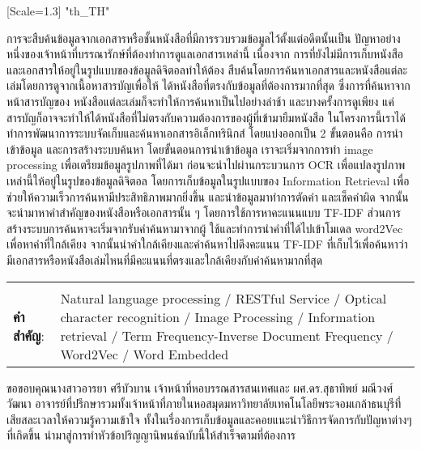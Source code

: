 \documentclass[12pt,oneside,openright,a4paper]{cpe-thai-project}
\begin{document}
{\newfontfamily{}[Scale=1.3]
\XeTeXlinebreaklocale "th_TH"	
\thaifont
\thaiabstract

การจะสืบค้นข้อมูลจากเอกสารหรือชั้นหนังสือที่มีการรวบรวมข้อมูลไว้ตั้งแต่อดีตนั้นเป็น
ปัญหาอย่างหนึ่งของเจ้าหน้าที่บรรณารักษ์ที่ต้องทำการดูแลเอกสารเหล่านี้ เนื่องจาก
การที่ยังไม่มีการเก็บหนังสือและเอกสารให้อยู่ในรูปแบบของข้อมูลดิจิตอลทำให้ต้อง
สืบค้นโดยการค้นหาเอกสารและหนังสือแต่ละเล่มโดยการดูจากเนื้อหาสารบัญเพื่อให้
ได้หนังสือที่ตรงกับข้อมูลที่ต้องการมากที่สุด ซึ่งการที่ค้นหาจากหน้าสารบัญของ
หนังสือแต่ละเล่มก็จะทำให้การค้นหาเป็นไปอย่างล่าช้า และบางครั้งการดูเพียง
แค่สารบัญก็อาจจะทำให้ได้หนังสือที่ไม่ตรงกับความต้องการของผู้ที่เข้ามายืมหนังสือ 
ในโครงการนี้เราได้ทำการพัฒนาการระบบจัดเก็บและค้นหาเอกสารอิเล็กทรินิกส์ 
โดยแบ่งออกเป็น 2 ขั้นตอนคือ การนำเข้าข้อมูล  และการสร้างระบบค้นหา 
โดยขั้นตอนการนำเข้าข้อมูล เราจะเริ่มจากการทำ image processing 
เพื่อเตรียมข้อมูลรูปภาพที่ได้มา ก่อนจะนำไปผ่านกระบวนการ OCR 
เพื่อแปลงรูปภาพเหล่านี้ให้อยู่ในรูปของข้อมูลดิจิตอล โดยการเก็บข้อมูลในรูปแบบของ 
Information Retrieval เพื่อช่วยให้ความเร็วการค้นหามีประสิทธิภาพมากยิ่งขึ้น 
และนำข้อมูลมาทำการตัดคำ และเช็คคำผิด จากนั้นจะนำมาหาคำสำคัญของหนังสือหรือเอกสารนั้น ๆ
โดยการใช้การหาคะแนนแบบ TF-IDF ส่วนการสร้างระบบการค้นหาจะเริ่มจากรับคำค้นหามาจากผู้
ใช้และทำการนำคำที่ได้ไปเข้าโมเดล word2Vec เพื่อหาคำที่ใกล้เคียง 
จากนั้นนำคำใกล้เคียงและคำค้นหาไปดึงคะแนน TF-IDF ที่เก็บไว้เพื่อค้นหาว่า
มีเอกสารหรือหนังสือเล่มไหนที่มีคะแนนที่ตรงและใกล้เคียงกับคำค้นหามากที่สุด

\begin{flushleft}
\begin{tabular*}{\textwidth}{@{}lp{}}
 & \\

\textbf{คำสำคัญ}: & Natural language processing / RESTful Service / Optical character recognition / Image Processing / Information retrieval / Term Frequency-Inverse Document Frequency / Word2Vec / Word Embedded 
\end{tabular*}
\end{flushleft}
\endabstract
}

\preface
ขอขอบคุณนางสาวอารยา ศรีบัวบาน เจ้าหน้าที่หอบรรณสารสนเทศและ ผศ.ดร.สุธาทิพย์ มณีวงศ์วัฒนา อาจารย์ที่ปรึกษารวมทั้งเจ้าหน้าที่ภายในหอสมุดมหาวิทยาลัยเทคโนโลยีพระจอมเกล้าธนบุรีที่เสียสละเวลาให้ความรู้ความเข้าใจ ทั้งในเรื่องการเก็บข้อมูลและคอยแนะนำวิธีการจัดการกับปัญหาต่างๆที่เกิดขึ้น นำมาสู่การทำหัวข้อปริญญานิพนธ์ฉบับนี้ให้สำเร็จตามที่ต้องการ 
\end{document}
